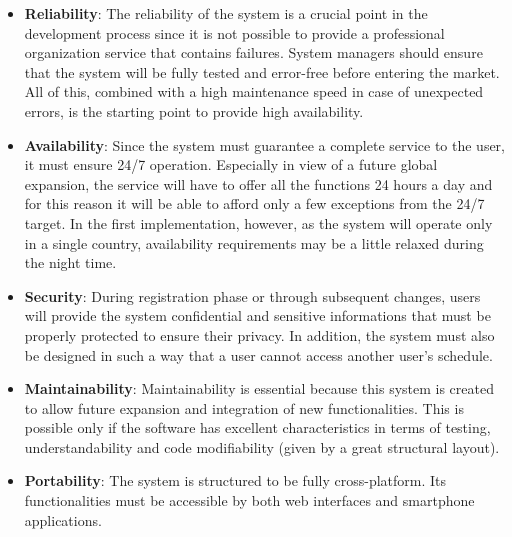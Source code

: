 \begin{itemize}
	\item \textbf{Reliability}: The reliability of the system is a crucial point in the development process since it is not possible to provide a professional organization service that contains failures. System managers should ensure that the system will be fully tested and error-free before entering the market. All of this, combined with a high maintenance speed in case of unexpected errors, is the starting point to provide high availability.
	\item \textbf{Availability}: Since the system must guarantee a complete service to the user, it must ensure 24/7 operation. Especially in view of a future global expansion, the service will have to offer all the functions 24 hours a day and for this reason it will be able to afford only a few exceptions from the 24/7 target. In the first implementation, however, as the system will operate only in a single country, availability requirements may be a little relaxed during the night time.
	\item \textbf{Security}: During registration phase or through subsequent changes, users will provide the system confidential and sensitive informations that must be properly protected to ensure their privacy. In addition, the system must also be designed in such a way that a user cannot access another user's schedule.
	\item \textbf{Maintainability}: Maintainability is essential because this system is created to allow future expansion and integration of new functionalities. This is possible only if the software has excellent characteristics in terms of testing, understandability and code modifiability (given by a great structural layout).
	\item \textbf{Portability}: The system is structured to be fully cross-platform. Its functionalities must be accessible by both web interfaces and smartphone applications.
\end{itemize}